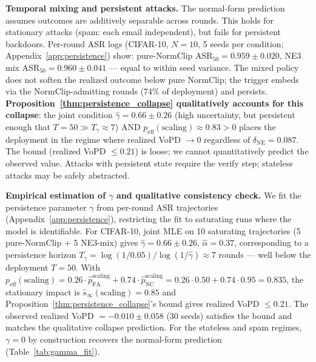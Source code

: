\documentclass{article}
\begin{document}
\textbf{Temporal mixing and persistent attacks.} The normal-form prediction assumes outcomes are additively separable across rounds. This holds for stationary attacks (spam: each email independent), but fails for persistent backdoors. Per-round ASR logs (CIFAR-10, $N{=}10$, 5 seeds per condition; Appendix~\ref{app:persistence}) show: pure-NormClip ASR$_{50} = 0.959\pm0.020$, NE3 mix ASR$_{50} = 0.960\pm0.041$ --- equal to within seed variance. The mixed policy does not soften the realized outcome below pure NormClip; the trigger embeds via the NormClip-admitting rounds (74\% of deployment) and persists. \textbf{Proposition~\ref{thm:persistence_collapse} qualitatively accounts for this collapse}: the joint condition $\hat\gamma=0.66\pm0.26$ (high uncertainty, but persistent enough that $T=50 \gg T_\gamma \approx 7$) AND $p_{\mathrm{eff}}(\text{scaling}) \approx 0.83 > 0$ places the deployment in the regime where realized VoPD $\to 0$ regardless of $\delta_{\mathrm{NE}}=0.087$. The bound (realized VoPD $\leq 0.21$) is loose; we cannot quantitatively predict the observed value. Attacks with persistent state require the verify step; stateless attacks may be safely abstracted.

\textbf{Empirical estimation of $\gamma$ and qualitative consistency check.}
We fit the persistence parameter $\gamma$ from per-round ASR trajectories (Appendix~\ref{app:persistence}), restricting the fit to saturating runs where the model is identifiable. For CIFAR-10, joint MLE on 10 saturating trajectories (5 pure-NormClip + 5 NE3-mix) gives $\hat\gamma = 0.66 \pm 0.26$, $\hat\alpha = 0.37$, corresponding to a persistence horizon $T_\gamma = \log(1/0.05)/\log(1/\hat\gamma) \approx 7$ rounds --- well below the deployment $T=50$. With $p_{\mathrm{eff}}(\text{scaling}) = 0.26 \cdot \hat p_{\mathrm{FA}}^{\text{scaling}} + 0.74 \cdot \hat p_{\mathrm{NC}}^{\text{scaling}} = 0.26 \cdot 0.50 + 0.74 \cdot 0.95 = 0.835$, the stationary impact is $\hat s_\infty(\text{scaling}) = 0.85$ and Proposition~\ref{thm:persistence_collapse}'s bound gives realized VoPD $\leq 0.21$. The observed realized VoPD $= -0.010 \pm 0.058$ (30 seeds) satisfies the bound and matches the qualitative collapse prediction. For the stateless and spam regimes, $\gamma = 0$ by construction recovers the normal-form prediction (Table~\ref{tab:gamma_fit}).
\end{document}

